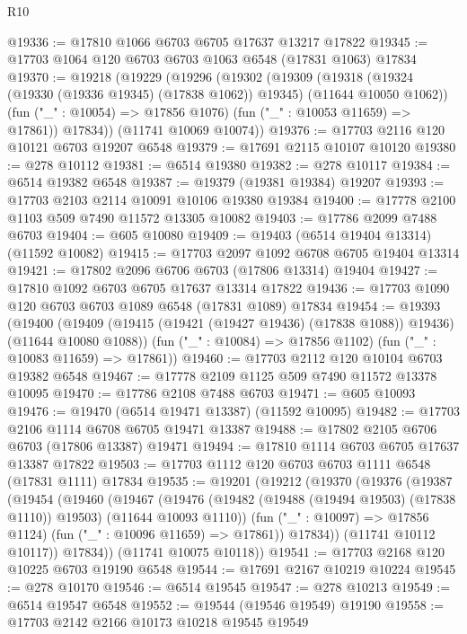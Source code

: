 \begin{lexlean}{R10}
\begin{coremodule}
@19336 := @17810 @1066 @6703 @6705 @17637 @13217 @17822
@19345 := @17703 @1064 @120 @6703 @6703 @1063 @6548 (@17831 @1063) @17834
@19370 := @19218
    (@19229
      (@19296
        (@19302
          (@19309
            (@19318 (@19324 (@19330 (@19336 @19345) (@17838 @1062)) @19345) (@11644 @10050 @1062))
            (fun ("_" : @10054) => @17856 @1076)
            (fun ("_" : @10053 @11659) => @17861))
          @17834))
      (@11741 @10069 @10074))
@19376 := @17703 @2116 @120 @10121 @6703 @19207 @6548
@19379 := @17691 @2115 @10107 @10120
@19380 := @278 @10112
@19381 := @6514 @19380
@19382 := @278 @10117
@19384 := @6514 @19382 @6548
@19387 := @19379 (@19381 @19384) @19207
@19393 := @17703 @2103 @2114 @10091 @10106 @19380 @19384
@19400 := @17778 @2100 @1103 @509 @7490 @11572 @13305 @10082
@19403 := @17786 @2099 @7488 @6703
@19404 := @605 @10080
@19409 := @19403 (@6514 @19404 @13314) (@11592 @10082)
@19415 := @17703 @2097 @1092 @6708 @6705 @19404 @13314
@19421 := @17802 @2096 @6706 @6703 (@17806 @13314) @19404
@19427 := @17810 @1092 @6703 @6705 @17637 @13314 @17822
@19436 := @17703 @1090 @120 @6703 @6703 @1089 @6548 (@17831 @1089) @17834
@19454 := @19393
    (@19400
      (@19409 (@19415 (@19421 (@19427 @19436) (@17838 @1088)) @19436) (@11644 @10080 @1088))
      (fun ("_" : @10084) => @17856 @1102)
      (fun ("_" : @10083 @11659) => @17861))
@19460 := @17703 @2112 @120 @10104 @6703 @19382 @6548
@19467 := @17778 @2109 @1125 @509 @7490 @11572 @13378 @10095
@19470 := @17786 @2108 @7488 @6703
@19471 := @605 @10093
@19476 := @19470 (@6514 @19471 @13387) (@11592 @10095)
@19482 := @17703 @2106 @1114 @6708 @6705 @19471 @13387
@19488 := @17802 @2105 @6706 @6703 (@17806 @13387) @19471
@19494 := @17810 @1114 @6703 @6705 @17637 @13387 @17822
@19503 := @17703 @1112 @120 @6703 @6703 @1111 @6548 (@17831 @1111) @17834
@19535 := @19201
    (@19212
      (@19370
        (@19376
          (@19387
            (@19454
              (@19460
                (@19467
                  (@19476
                    (@19482 (@19488 (@19494 @19503) (@17838 @1110)) @19503)
                    (@11644 @10093 @1110))
                  (fun ("_" : @10097) => @17856 @1124)
                  (fun ("_" : @10096 @11659) => @17861))
                @17834))
            (@11741 @10112 @10117))
          @17834))
      (@11741 @10075 @10118))
@19541 := @17703 @2168 @120 @10225 @6703 @19190 @6548
@19544 := @17691 @2167 @10219 @10224
@19545 := @278 @10170
@19546 := @6514 @19545
@19547 := @278 @10213
@19549 := @6514 @19547 @6548
@19552 := @19544 (@19546 @19549) @19190
@19558 := @17703 @2142 @2166 @10173 @10218 @19545 @19549

\end{coremodule}
\end{lexlean}
